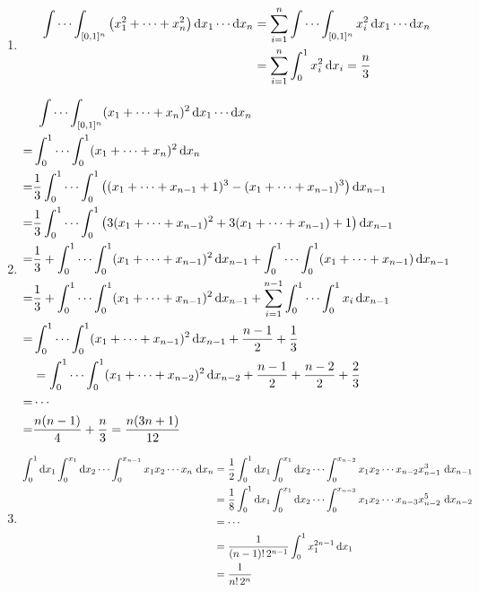 \begin{solution}
    \begin{enumerate}
        \item \begin{align*}
            \int \cdots \int_{[0,1]^n} \left( x_1^2 + \cdots + x_n^2 \right) \operatorname{d\!} x_1 \cdots \operatorname{d\!} x_n 
            &= \sum_{i=1}^n \int \cdots \int_{[0,1]^n} x_i^2 \operatorname{d\!} x_1 \cdots \operatorname{d\!} x_n \\
            &= \sum_{i=1}^n \int_0^1 x_i^2 \operatorname{d\!} x_i = \frac{n}{3}
            \end{align*}
            \item \begin{align*}
                & \ \int \cdots \int_{[0,1]^n} (x_1 + \cdots + x_n)^2 \dif x_1 \cdots \dif x_n\\ 
                =& \int_0^1 \cdots \int_0^1 (x_1 + \cdots + x_n)^2 \dif x_n \\
                =& \frac{1}{3} \int_0^1 \cdots \int_0^1 \left((x_1 + \cdots + x_{n-1} + 1)^3 - (x_1 + \cdots + x_{n-1})^3 \right) \dif x_{n-1} \\
                =& \frac{1}{3} \int_0^1 \cdots \int_0^1 \left( 3(x_1 + \cdots + x_{n-1})^2 + 3(x_1 + \cdots + x_{n-1}) + 1 \right) \dif x_{n-1} \\
                =& \frac{1}{3} + \int_0^1 \cdots \int_0^1 (x_1 + \cdots + x_{n-1})^2 \dif x_{n-1} 
                + \int_0^1 \cdots \int_0^1 (x_1 + \cdots + x_{n-1}) \dif x_{n-1} \\
                =& \frac{1}{3} + \int_0^1 \cdots \int_0^1 (x_1 + \cdots + x_{n-1})^2 \dif x_{n-1} 
                + \sum_{i=1}^{n-1} \int_0^1 \cdots \int_0^1 x_i \dif x_{n-1} \\
                =& \int_0^1 \cdots \int_0^1 (x_1 + \cdots + x_{n-1})^2 \dif x_{n-1} + \frac{n-1}{2} + \frac{1}{3} \\
                &= \int_0^1 \cdots \int_0^1 (x_1 + \cdots + x_{n-2})^2 \dif x_{n-2} + \frac{n-1}{2} + \frac{n-2}{2} + \frac{2}{3} \\
                =& \cdots \\
                =& \frac{n(n-1)}{4} + \frac{n}{3} = \frac{n(3n + 1)}{12}
                \end{align*}
        \item \begin{align*}
            \int_0^1 \dif x_1 \int_0^{x_1} \dif x_2 \cdots \int_0^{x_{n-1}} x_1 x_2 \cdots x_n \, \dif x_n 
            &= \frac{1}{2} \int_0^1 \dif x_1 \int_0^{x_1} \dif x_2 \cdots \int_0^{x_{n-2}} x_1 x_2 \cdots x_{n-2} x_{n-1}^3 \, \dif x_{n-1} \\
            &= \frac{1}{8} \int_0^1 \dif x_1 \int_0^{x_1} \dif x_2 \cdots \int_0^{x_{n-3}} x_1 x_2 \cdots x_{n-3} x_{n-2}^5 \, \dif x_{n-2} \\
            &= \cdots \\
            &= \frac{1}{(n-1)! \, 2^{n-1}} \int_0^1 x_1^{2n - 1} \dif x_1 \\
            &= \frac{1}{n! \, 2^n}
            \end{align*}
            
    \end{enumerate}
\end{solution}
